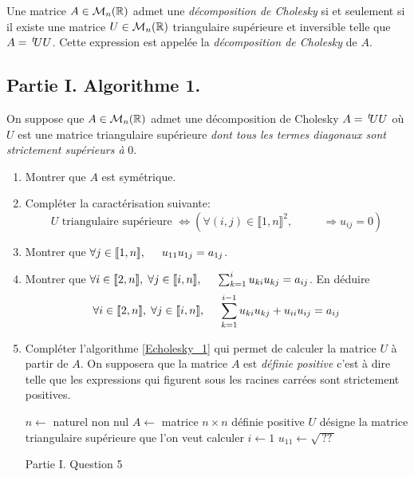 Une matrice $A\in \mathcal{M}_n(\mathbb{R})$ admet une \emph{décomposition de Cholesky} si et seulement si il existe une matrice $U\in \mathcal{M}_n(\mathbb{R})$ triangulaire supérieure et inversible telle que $A = \,\mathstrut^t\! U U$. Cette expression est appelée la \emph{décomposition de Cholesky} de $A$.
\subsection*{Partie I. Algorithme 1.}
On suppose que $A\in \mathcal{M}_n(\mathbb{R})$ admet une décomposition de Cholesky $A= \,\mathstrut^t\! U U$ où $U$ est une matrice triangulaire supérieure \emph{dont tous les termes diagonaux sont strictement supérieurs à} $0$.
\begin{enumerate}
 \item Montrer que $A$ est symétrique.
 \item Compléter la caractérisation suivante:
\begin{displaymath}
U \text{ triangulaire supérieure } \Leftrightarrow \left( \forall (i,j)\in \llbracket 1,n \rrbracket^2, \;\phantom{i > j}\; \Rightarrow u_{i j} = 0 \right) 
\end{displaymath}
 \item Montrer que $\forall j \in  \llbracket 1,n \rrbracket, \hspace{0.5cm} u_{1 1}u_{1 j} = a_{1 j}$.
 \item Montrer que $\forall i \in \llbracket 2,n \rrbracket,\; \forall j \in \llbracket i, n \rrbracket,\hspace{0.5cm}  \sum_{k = 1}^{i} u_{k i} u_{k j} = a_{i j}$.
En déduire 
\begin{displaymath}
 \forall i \in \llbracket 2,n \rrbracket,\; \forall j \in \llbracket i, n \rrbracket,\hspace{0.5cm}
 \sum_{k = 1}^{i-1} u_{k i} u_{k j} + u_{i i} u_{i j} = a_{i j}
\end{displaymath}
\item Compléter l'algorithme \ref{Echolesky_1} qui permet de calculer la matrice $U$ à partir de $A$. On supposera que la matrice $A$ est \emph{définie positive} c'est à dire telle que les expressions qui figurent sous les racines carrées sont strictement positives.
\begin{algorithm}
  $n\leftarrow $ naturel non  nul\;
  $A\leftarrow $ matrice $n\times n$ définie positive \;
  $U$ désigne la matrice triangulaire supérieure que l'on veut calculer \;
  $i\leftarrow 1$\;
  $u_{1 1} \leftarrow \sqrt{\,??\, }$\;
  \caption{Partie I. Question 5}
  \label{Echolesky_1}
\end{algorithm}

\end{enumerate}

